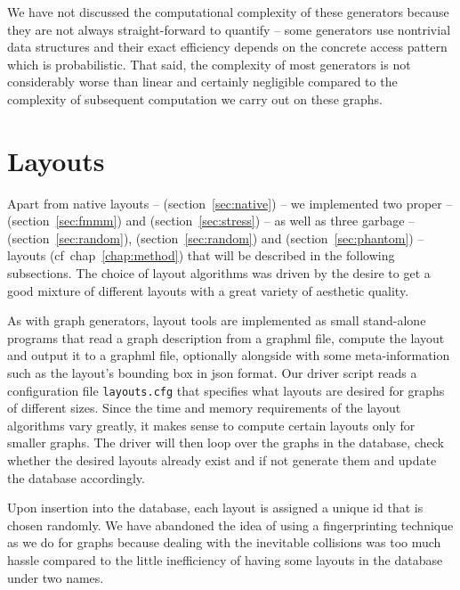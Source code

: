 \documentclass{graphstudy}
\begin{document}
We have not discussed the computational complexity of these generators because they are not always straight-forward to
quantify -- some generators use nontrivial data structures and their exact efficiency depends on the concrete access
pattern which is probabilistic.  That said, the complexity of most generators is not considerably worse than
linear and certainly negligible compared to the complexity of subsequent computation we carry out on these graphs.

\section{Layouts}
\label{sec:layouts}

Apart from native layouts --  (\acs{section}~\ref{sec:native}) -- we implemented two proper -- 
(\acs{section}~\ref{sec:fmmm}) and  (\acs{section}~\ref{sec:stress}) -- as well as three garbage --
 (\acs{section}~\ref{sec:random}),  (\acs{section}~\ref{sec:random}) and
 (\acs{section}~\ref{sec:phantom}) -- layouts (\acs{cf}~\acs{chap}~\ref{chap:method}) that will be
described in the following subsections.  The choice of layout algorithms was driven by the desire to get a good mixture
of different layouts with a great variety of aesthetic quality.

As with graph generators, layout tools are implemented as small stand-alone programs that read a graph description from
a \ac{graphml} file, compute the layout and output it to a \ac{graphml} file, optionally alongside with some
meta-information such as the layout's bounding box in \ac{json} format.  Our driver script reads a configuration file
\verb`layouts.cfg` that specifies what layouts are desired for graphs of different sizes.  Since the time and memory
requirements of the layout algorithms vary greatly, it makes sense to compute certain layouts only for smaller graphs.
The driver will then loop over the graphs in the database, check whether the desired layouts already exist and if not
generate them and update the database accordingly.

Upon insertion into the database, each layout is assigned a unique \acs{id} that is chosen randomly.  We have abandoned
the idea of using a fingerprinting technique as we do for graphs because dealing with the inevitable collisions was too
much hassle compared to the little inefficiency of having some layouts in the database under two names.
\end{document}

